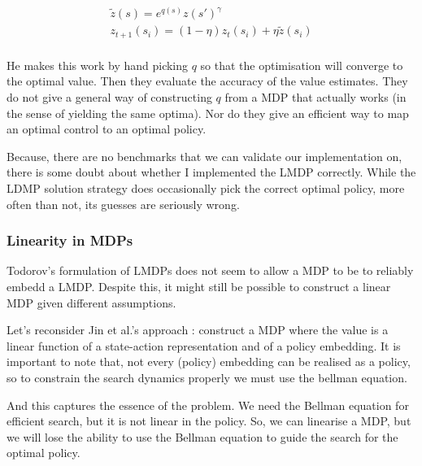 \begin{align*}
\tilde z(s) = e^{q(s)}z(s{'})^{\gamma} \tag{linearised bellman eqn}\\
z_{t+1}(s_i) = (1- \eta)z_{t}(s_i) + \eta\tilde z(s_i) \tag{$Z$ iteration}\\
\end{align*}

He makes this work by hand picking $q$ so that the optimisation will converge to the optimal value.
Then they evaluate the accuracy of the value estimates.
They do not give a general way of constructing $q$ from a MDP that actually works (in the sense of yielding the same optima).
Nor do they give an efficient way to map an optimal control to an optimal policy.


Because, there are no benchmarks that we can validate our implementation on,
there is some doubt about whether I implemented the LMDP correctly. While the
LDMP solution strategy does occasionally pick the correct optimal policy, more often than not,
its guesses are seriously wrong.

\subsubsection{Linearity in MDPs}

Todorov's formulation of LMDPs does not seem to allow a MDP to be to reliably embedd a LMDP.
Despite this, it might still be possible to construct a linear MDP given different assumptions.

Let's reconsider Jin et al.'s approach \cite{Wang}: construct a MDP where the value is a
linear function of a state-action representation and of a policy embedding.
It is important to note that, not every (policy) embedding can be realised as a policy, so to constrain the search dynamics properly
we must use the bellman equation.

And this captures the essence of the problem. We need the Bellman equation for efficient search, but it is not linear in the policy.
So, we can linearise a MDP, but we will lose the ability to use the Bellman equation to guide the search for the optimal policy.

